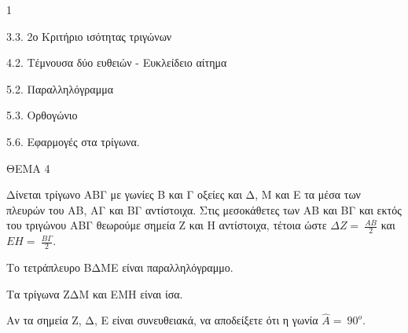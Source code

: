 \begin{ylh}{1}
    \item 3.3. 2ο Κριτήριο ισότητας τριγώνων
    \item 4.2. Τέμνουσα δύο ευθειών - Ευκλείδειο αίτημα
    \item 5.2. Παραλληλόγραμμα
    \item 5.3. Ορθογώνιο
    \item 5.6. Εφαρμογές στα τρίγωνα.
\end{ylh}

ΘΕΜΑ 4

Δίνεται τρίγωνο ΑΒΓ με γωνίες Β και Γ οξείες και Δ, Μ και Ε τα μέσα των πλευρών του ΑΒ, ΑΓ και ΒΓ αντίστοιχα. Στις μεσοκάθετες των ΑΒ και ΒΓ και εκτός του τριγώνου ΑΒΓ θεωρούμε σημεία Ζ και Η αντίστοιχα, τέτοια ώστε $\Delta Ζ = \ \frac{ΑΒ}{2}$ και $ΕΗ = \ \frac{Β\Gamma}{2}$.

\begin{alist}
\item Να αποδείξετε ότι:

.}
\end{alist}
\begin{alist}
\item
  Το τετράπλευρο ΒΔΜΕ είναι παραλληλόγραμμο. 
\item
  Τα τρίγωνα ΖΔΜ και ΕΜΗ είναι ίσα. 

\item Αν τα σημεία Ζ, Δ, Ε είναι συνευθειακά, να αποδείξετε ότι η γωνία $\widehat{Α} = \ 90^{ο}$. 


\end{alist}
